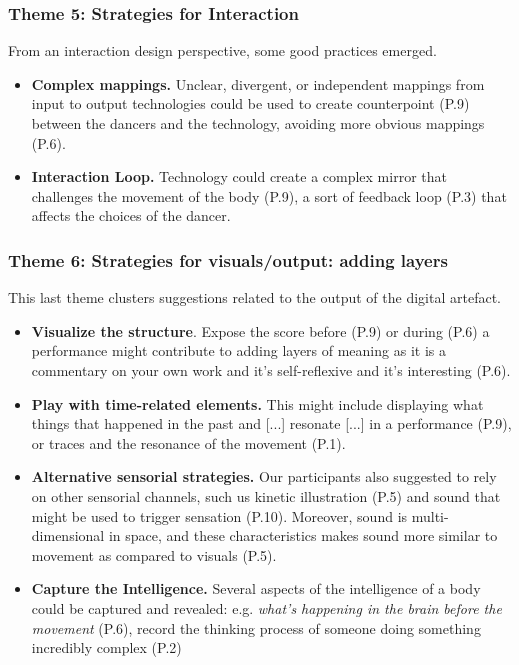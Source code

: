 \subsubsection{Theme 5: Strategies for Interaction}

From an interaction design perspective, some good practices emerged. 

\begin{itemize}
\item \textbf{Complex mappings.} Unclear, divergent, or independent mappings from input to output technologies could be used to create counterpoint (P.9) between the dancers and the technology, avoiding more obvious mappings (P.6).
\item \textbf{Interaction Loop.} Technology could create a complex mirror that challenges the movement of the body (P.9), a sort of feedback loop (P.3) that affects the choices of the dancer.
\end{itemize}

\subsubsection{Theme 6: Strategies for visuals/output: adding layers}

This last theme clusters suggestions related to the output of the digital artefact.  

\begin{itemize}
\item \textbf{Visualize the structure}. Expose the score before (P.9) or during (P.6) a performance might contribute to adding layers of meaning as it is a commentary on your own work and it’s self-reflexive and it’s interesting (P.6).
\item \textbf{Play with time-related elements.} This might include displaying what things that happened in the past and [...] resonate [...] in a performance (P.9), or traces and the resonance of the movement (P.1).
\item \textbf{Alternative sensorial strategies.} Our participants also suggested to rely on other sensorial channels, such us kinetic illustration (P.5) and sound that might be used to trigger sensation (P.10). Moreover, sound is multi-dimensional in space, and these characteristics makes sound more similar to movement as compared to visuals (P.5).
\item \textbf{Capture the Intelligence.} Several aspects of the intelligence of a body could be captured and revealed: e.g. \textit{what’s happening in the brain before the movement} (P.6), record the thinking process of someone doing something incredibly complex (P.2) 
\end{itemize}

